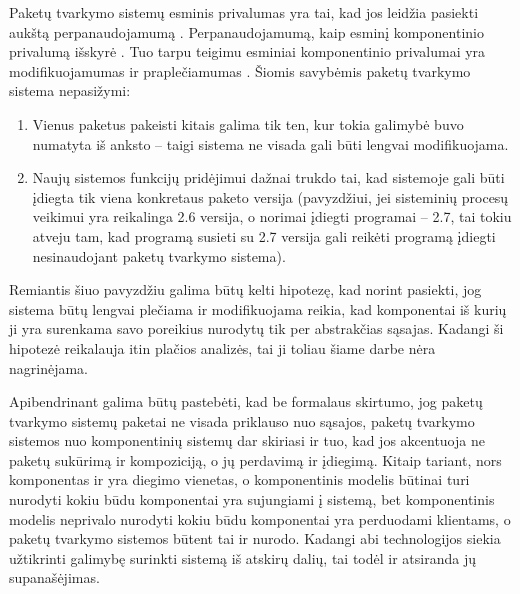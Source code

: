Paketų tvarkymo sistemų esminis privalumas yra tai, kad jos leidžia
pasiekti aukštą perpanaudojamumą . Perpanaudojamumą,
kaip esminį komponentinio privalumą išskyrė 
\cite{what-to-compose}.
Tuo tarpu  \cite{point-counterpoint}
teigimu esminiai komponentinio privalumai yra modifikuojamumas
 ir praplečiamumas . Šiomis
savybėmis  paketų tvarkymo sistema nepasižymi:
\begin{enumerate}
  \item Vienus paketus pakeisti kitais galima tik ten, kur tokia galimybė
    buvo numatyta iš anksto – taigi sistema ne visada gali būti
    lengvai modifikuojama.
  \item Naujų sistemos funkcijų pridėjimui dažnai trukdo tai,
    kad sistemoje gali būti įdiegta tik viena konkretaus paketo
    versija (pavyzdžiui, jei sisteminių procesų veikimui yra reikalinga
    2.6  versija, o norimai įdiegti programai – 2.7,
    tai tokiu atveju tam, kad programą susieti su 2.7 versija gali
    reikėti programą įdiegti nesinaudojant paketų tvarkymo sistema).
\end{enumerate}
Remiantis šiuo pavyzdžiu galima būtų kelti hipotezę, kad norint
pasiekti, jog sistema būtų lengvai plečiama ir modifikuojama reikia,
kad komponentai iš kurių ji yra surenkama savo poreikius nurodytų
tik per abstrakčias sąsajas. Kadangi ši hipotezė reikalauja itin
plačios analizės, tai ji toliau šiame darbe nėra nagrinėjama.

Apibendrinant galima būtų pastebėti, kad be formalaus skirtumo, jog
paketų tvarkymo sistemų paketai ne visada priklauso nuo sąsajos,
paketų tvarkymo sistemos nuo komponentinių sistemų dar skiriasi ir
tuo, kad jos akcentuoja ne paketų sukūrimą ir kompoziciją, o jų
perdavimą ir įdiegimą. Kitaip tariant, nors komponentas ir yra
diegimo vienetas, o komponentinis modelis būtinai turi nurodyti
kokiu būdu komponentai yra sujungiami į sistemą, bet komponentinis
modelis neprivalo nurodyti kokiu būdu komponentai yra perduodami
klientams, o paketų tvarkymo sistemos būtent tai ir nurodo. Kadangi
abi technologijos siekia užtikrinti galimybę surinkti sistemą
iš atskirų dalių, tai todėl ir atsiranda jų supanašėjimas.
